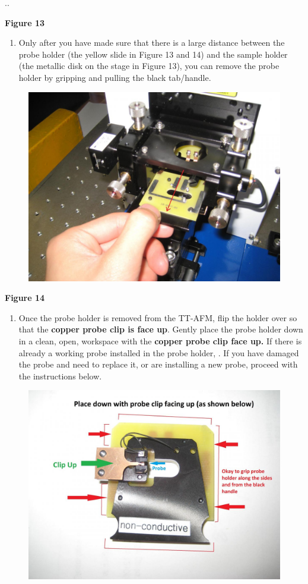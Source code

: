 \documentclass{../lab}
\begin{document}
..

\textbf{Figure 13}

\begin{enumerate}
    \item Only after you have made sure that there is a large distance between the probe holder (the yellow slide in Figure 13 and 14) and the sample holder (the metallic disk on the stage in Figure 13), you can remove the probe holder by gripping and pulling the black tab/handle.

\end{enumerate}


\begin{figure}[h]
    \centering
    \href{http://dev-physicsadv.pantheon.berkeley.edu/sites/default/files/AFMImages/14.JPG}{\includegraphics[width=0.5\linewidth]{images/14.JPG}}
    \caption{}
    \label{fig:14}
\end{figure}

\textbf{Figure 14}

\begin{enumerate}
    \item Once the probe holder is removed from the TT-AFM, flip the holder over so that the \textbf{copper probe clip is face up}.  Gently place the probe holder down in a clean, open, workspace with the \textbf{copper probe clip face up.  }If there is already a working probe installed in the probe holder, \textbf{}.  If you have damaged the probe and need to replace it, or are installing a new probe, proceed with the instructions below.

\end{enumerate}


\begin{figure}[h]
    \centering
    \href{http://dev-physicsadv.pantheon.berkeley.edu/sites/default/files/AFMImages/15.JPG}{\includegraphics[width=0.5\linewidth]{images/15.JPG}}
    \caption{}
    \label{fig:15}
\end{figure}
\end{document}
